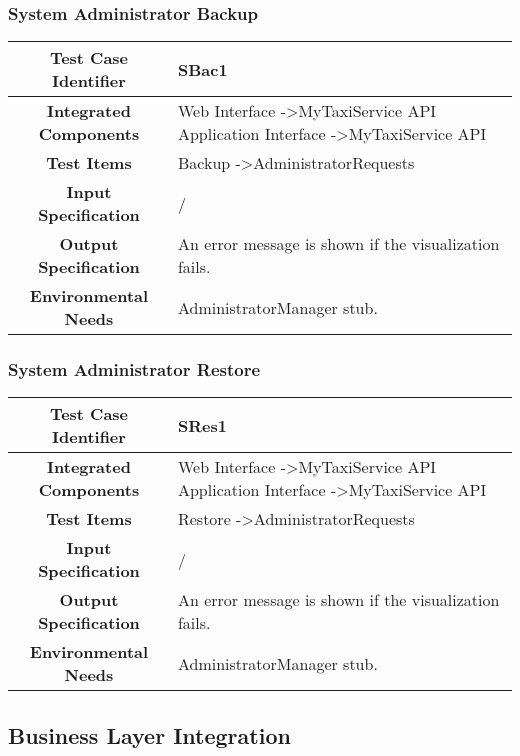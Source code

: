\documentclass[11pt, a4paper,titlepage]{article}
\begin{document}
	\subsubsection{System Administrator Backup}
	\begin{tabularx}{\textwidth}{| c|X|}
		\hline \textbf{Test Case Identifier} & SBac1 \\
		\hline \textbf{Integrated Components} & Web Interface -\textgreater MyTaxiService API \newline 
		Application Interface -\textgreater MyTaxiService API \\
		\hline \textbf{Test Items} & Backup -\textgreater AdministratorRequests \\
		\hline \textbf{Input Specification} & / \\
		\hline \textbf{Output Specification} & An error message is shown if the visualization fails. \\
		\hline \textbf{Environmental Needs} & AdministratorManager stub. \\
		\hline
	\end{tabularx}
	\newline
	\newline
	\subsubsection{System Administrator Restore}
	\begin{tabularx}{\textwidth}{| c|X|}
		\hline \textbf{Test Case Identifier} & SRes1 \\
		\hline \textbf{Integrated Components} & Web Interface -\textgreater MyTaxiService API \newline 
		Application Interface -\textgreater MyTaxiService API \\
		\hline \textbf{Test Items} & Restore -\textgreater AdministratorRequests \\
		\hline \textbf{Input Specification} & / \\
		\hline \textbf{Output Specification} & An error message is shown if the visualization fails. \\
		\hline \textbf{Environmental Needs} & AdministratorManager stub. \\
		\hline
	\end{tabularx}
	\subsection{Business Layer Integration}
\end{document}
